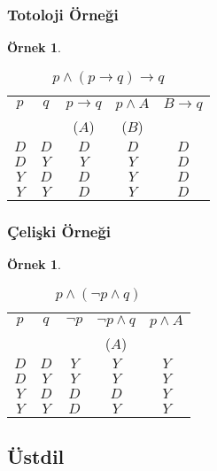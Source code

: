 \documentclass[dvipsnames]{beamer}
\theoremstyle{definition}
\theoremstyle{example}
\newtheorem{ornek}[theorem]{Örnek}
\theoremstyle{plain}
\begin{document}
\begin{frame}
  \frametitle{Totoloji Örneği}

  \begin{ornek}
    \begin{table}
      \caption{$p \wedge (p \rightarrow q) \rightarrow q$}
      \begin{tabular}{|c|c|c|c||c|}\hline
        $p$ & $q$ & $p \rightarrow q$ & $p \wedge A$ & $B \rightarrow q$\\
            &     & ($A$)             & ($B$)        &\\\hline\hline
        $D$ & $D$ & $D$ & $D$ & $D$\\\hline
        $D$ & $Y$ & $Y$ & $Y$ & $D$\\\hline
        $Y$ & $D$ & $D$ & $Y$ & $D$\\\hline
        $Y$ & $Y$ & $D$ & $Y$ & $D$\\\hline
      \end{tabular}
    \end{table}
  \end{ornek}
\end{frame}

\begin{frame}
  \frametitle{Çelişki Örneği}

  \begin{ornek}
    \begin{table}
      \caption{$p \wedge (\neg p \wedge q)$}
      \begin{tabular}{|c|c|c|c||c|}\hline
        $p$ & $q$ & $\neg p$ & $\neg p \wedge q$ & $p \wedge A$\\
            &     &          & ($A$)             &\\\hline\hline
        $D$ & $D$ & $Y$ & $Y$ & $Y$\\\hline
        $D$ & $Y$ & $Y$ & $Y$ & $Y$\\\hline
        $Y$ & $D$ & $D$ & $D$ & $Y$\\\hline
        $Y$ & $Y$ & $D$ & $Y$ & $Y$\\\hline
      \end{tabular}
    \end{table}
  \end{ornek}
\end{frame}

\subsection{Üstdil}
\end{document}
